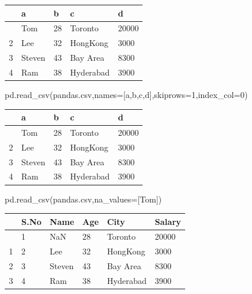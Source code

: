 \documentclass[
  a4paper,
  DIV=11,
  numbers=noendperiod]{scrreprt}
\newenvironment{Shaded}{\begin{snugshade}}{\end{snugshade}}
\newcommand{\DecValTok}[1]{\textcolor[rgb]{0.68,0.00,0.00}{#1}}
\newcommand{\NormalTok}[1]{\textcolor[rgb]{0.00,0.23,0.31}{#1}}
\newcommand{\OperatorTok}[1]{\textcolor[rgb]{0.37,0.37,0.37}{#1}}
\newcommand{\StringTok}[1]{\textcolor[rgb]{0.13,0.47,0.30}{#1}}
\begin{document}
\begin{longtable}[]{@{}lllll@{}}
\toprule\noalign{}
& a & b & c & d \\
\midrule\noalign{}
\endhead
\bottomrule\noalign{}
\endlastfoot
1 & Tom & 28 & Toronto & 20000 \\
2 & Lee & 32 & HongKong & 3000 \\
3 & Steven & 43 & Bay Area & 8300 \\
4 & Ram & 38 & Hyderabad & 3900 \\
\end{longtable}

\begin{Shaded}
\begin{Highlighting}[]
\NormalTok{pd.read\_csv(}\StringTok{\textquotesingle{}pandas.csv\textquotesingle{}}\NormalTok{,names}\OperatorTok{=}\NormalTok{[}\StringTok{\textquotesingle{}a\textquotesingle{}}\NormalTok{,}\StringTok{\textquotesingle{}b\textquotesingle{}}\NormalTok{,}\StringTok{\textquotesingle{}c\textquotesingle{}}\NormalTok{,}\StringTok{\textquotesingle{}d\textquotesingle{}}\NormalTok{],skiprows}\OperatorTok{=}\DecValTok{1}\NormalTok{,index\_col}\OperatorTok{=}\DecValTok{0}\NormalTok{)}
\end{Highlighting}
\end{Shaded}

\begin{longtable}[]{@{}lllll@{}}
\toprule\noalign{}
& a & b & c & d \\
\midrule\noalign{}
\endhead
\bottomrule\noalign{}
\endlastfoot
1 & Tom & 28 & Toronto & 20000 \\
2 & Lee & 32 & HongKong & 3000 \\
3 & Steven & 43 & Bay Area & 8300 \\
4 & Ram & 38 & Hyderabad & 3900 \\
\end{longtable}

\begin{Shaded}
\begin{Highlighting}[]
\NormalTok{pd.read\_csv(}\StringTok{\textquotesingle{}pandas.csv\textquotesingle{}}\NormalTok{,na\_values}\OperatorTok{=}\NormalTok{[}\StringTok{\textquotesingle{}Tom\textquotesingle{}}\NormalTok{])}
\end{Highlighting}
\end{Shaded}

\begin{longtable}[]{@{}llllll@{}}
\toprule\noalign{}
& S.No & Name & Age & City & Salary \\
\midrule\noalign{}
\endhead
\bottomrule\noalign{}
\endlastfoot
0 & 1 & NaN & 28 & Toronto & 20000 \\
1 & 2 & Lee & 32 & HongKong & 3000 \\
2 & 3 & Steven & 43 & Bay Area & 8300 \\
3 & 4 & Ram & 38 & Hyderabad & 3900 \\
\end{longtable}
\end{document}
